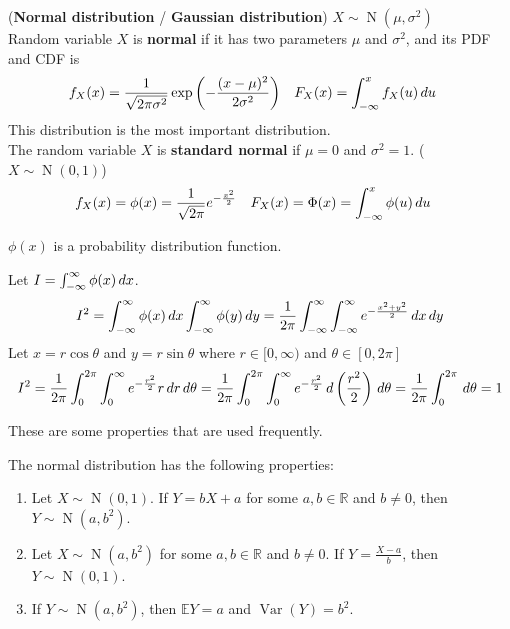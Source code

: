 \documentclass{huhtakm-template-book}
\newcommand{\expect}{\mathbb{E}}
\DeclareMathOperator{\N}{N}
\DeclareMathOperator{\Var}{Var}
\begin{document}
    \newpage
    \begin{eg}(\textbf{Normal distribution} / \textbf{Gaussian distribution}) $X\sim\N(\mu,\sigma^{2})$\\
        Random variable $X$ is \textbf{normal} if it has two parameters $\mu$ and $\sigma^{2}$, and its PDF and CDF is
        \begin{align*}
            f_{X}(x)&=\frac{1}{\sqrt{2\pi\sigma^{2}}}\exp\left(-\frac{(x-\mu)^{2}}{2\sigma^{2}}\right) & F_{X}(x)&=\int_{-\infty}^{x}f_{X}(u)\,du
        \end{align*}
        This distribution is the most important distribution.\\
        The random variable $X$ is \textbf{standard normal} if $\mu=0$ and $\sigma^{2}=1$. ($X\sim\N(0,1)$)
        \begin{align*}
            f_{X}(x)&=\phi(x)=\frac{1}{\sqrt{2\pi}}e^{-\frac{x^{2}}{2}} & F_{X}(x)&=\Phi(x)=\int_{-\infty}^{x}\phi(u)\,du
        \end{align*}
    \end{eg}
    \begin{cla}
        $\phi(x)$ is a probability distribution function.
    \end{cla}
    \begin{proofing}
        Let $I=\int_{-\infty}^{\infty}\phi(x)\,dx$.
        \begin{equation*}
            I^{2}=\int_{-\infty}^{\infty}\phi(x)\,dx\int_{-\infty}^{\infty}\phi(y)\,dy=\frac{1}{2\pi}\int_{-\infty}^{\infty}\int_{-\infty}^{\infty} e^{-\frac{x^{2}+y^{2}}{2}}\,dx\,dy
        \end{equation*}
        Let $x=r\cos\theta$ and $y=r\sin\theta$ where $r\in[0,\infty)$ and $\theta\in[0,2\pi]$
        \begin{equation*}
            I^{2}=\frac{1}{2\pi}\int_{0}^{2\pi}\int_{0}^{\infty}e^{-\frac{r^{2}}{2}}r\,dr\,d\theta=\frac{1}{2\pi}\int_{0}^{2\pi}\int_{0}^{\infty}e^{-\frac{r^{2}}{2}}\,d\left(\frac{r^{2}}{2}\right)\,d\theta=\frac{1}{2\pi}\int_{0}^{2\pi}\,d\theta=1
        \end{equation*}
    \end{proofing}
    These are some properties that are used frequently.
    \begin{lem}
        The normal distribution has the following properties:
        \begin{enumerate}
            \item Let $X\sim\N(0,1)$. If $Y=bX+a$ for some $a,b\in\mathbb{R}$ and $b\neq 0$, then $Y\sim\N(a,b^{2})$.
            \item Let $X\sim\N(a,b^{2})$ for some $a,b\in\mathbb{R}$ and $b\neq 0$. If $Y=\frac{X-a}{b}$, then $Y\sim\N(0,1)$.
            \item If $Y\sim\N(a,b^{2})$, then $\expect Y=a$ and $\Var(Y)=b^{2}$.
        \end{enumerate}
    \end{lem}
\end{document}
